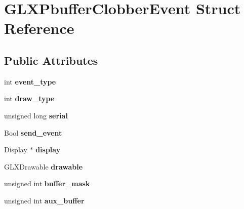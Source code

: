 \hypertarget{structGLXPbufferClobberEvent}{}\section{G\+L\+X\+Pbuffer\+Clobber\+Event Struct Reference}
\label{structGLXPbufferClobberEvent}
\subsection*{Public Attributes}
\begin{DoxyCompactItemize}
\item 
\mbox{\label{structGLXPbufferClobberEvent_a30d7162d8d77246b01f5e610cda4da68}} 
int {\bfseries event\+\_\+type}
\item 
\mbox{\label{structGLXPbufferClobberEvent_a243f92b79d3cfbde73eab02815be2320}} 
int {\bfseries draw\+\_\+type}
\item 
\mbox{\label{structGLXPbufferClobberEvent_a6390b2875ae06a4cb827d2b4c321eda3}} 
unsigned long {\bfseries serial}
\item 
\mbox{\label{structGLXPbufferClobberEvent_aa51969e67e4ad6095bda26ca64fe8ba6}} 
Bool {\bfseries send\+\_\+event}
\item 
\mbox{\label{structGLXPbufferClobberEvent_aeb49bb93cc59448e75d66170a39596d1}} 
Display $\ast$ {\bfseries display}
\item 
\mbox{\label{structGLXPbufferClobberEvent_a388908b766e35205c1a461ea8b60439f}} 
G\+L\+X\+Drawable {\bfseries drawable}
\item 
\mbox{\label{structGLXPbufferClobberEvent_aff4c23d00f6dad98427f8d32a5f10580}} 
unsigned int {\bfseries buffer\+\_\+mask}
\item 
\mbox{\label{structGLXPbufferClobberEvent_a13193b6e7e3e52b15f754fe91403b7ec}} 
unsigned int {\bfseries aux\+\_\+buffer}
\item 
\mbox{\label{structGLXPbufferClobberEvent_a8f0a7162a033c89ee94ce535580dbc32}} 

\end{DoxyCompactItemize}
